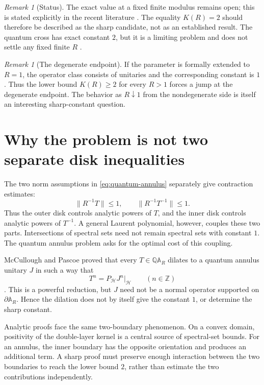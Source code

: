 \documentclass[11pt]{article}
\theoremstyle{definition}
\theoremstyle{remark}
\newtheorem{remark}[theorem]{Remark}
\newcommand{\AR}{\mathbb A_R}
\newcommand{\QAR}{\mathbb Q\mathbb A_R}
\begin{document}
\begin{remark}[Status]
The exact value at a fixed finite modulus remains open; this is
stated explicitly in the recent literature
\cite{PalPascoeTomar2026,Tsikalas2026}.  The equality
\(K(R)=2\) should therefore be described as the sharp candidate, not
as an established result.  The quantum cross has exact constant
\(2\), but it is a limiting problem and does not settle any fixed
finite \(R\) \cite{Pascoe2025}.
\end{remark}

\begin{remark}[The degenerate endpoint]
If the parameter is formally extended to \(R=1\), the operator class
consists of unitaries and the corresponding constant is \(1\).
Thus the lower bound \(K(R)\geq2\) for every \(R>1\) forces a jump at
the degenerate endpoint.  The behavior as \(R\downarrow1\) from the
nondegenerate side is itself an interesting sharp-constant question.
\end{remark}

\section{Why the problem is not two separate disk inequalities}

The two norm assumptions in \eqref{eq:quantum-annulus} separately
give contraction estimates:
\[
 \|R^{-1}T\|\leq1,
 \qquad
 \|R^{-1}T^{-1}\|\leq1.
\]
Thus the outer disk controls analytic powers of \(T\), and the inner
disk controls analytic powers of \(T^{-1}\).  A general Laurent
polynomial, however, couples these two parts.  Intersections of
spectral sets need not remain spectral sets with constant \(1\).
The quantum annulus problem asks for the optimal cost of this
coupling.

McCullough and Pascoe proved that every \(T\in\QAR\) dilates to a
quantum annulus unitary \(J\) in such a way that
\[
 T^n=P_{\mathcal H}J^n|_{\mathcal H}
 \qquad(n\in\mathbb Z)
\]
\cite{McCulloughPascoe2023}.  This is a powerful reduction, but
\(J\) need not be a normal operator supported on
\(\partial\AR\).  Hence the dilation does not by itself give the
constant \(1\), or determine the sharp constant.

Analytic proofs face the same two-boundary phenomenon.  On a convex
domain, positivity of the double-layer kernel is a central source of
spectral-set bounds.  For an annulus, the inner boundary has the
opposite orientation and produces an additional term.  A sharp proof
must preserve enough interaction between the two boundaries to reach
the lower bound \(2\), rather than estimate the two contributions
independently.
\end{document}
